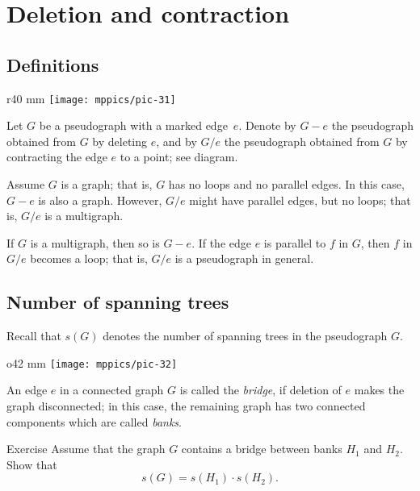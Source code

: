 \chapter{Deletion and contraction}
\label{Deletion and contraction}

\section{Definitions}


\begin{wrapfigure}{r}{40 mm}
\vskip-12mm
\centering
\texttt{[image: mppics/pic-31]}
\vskip-0mm
\end{wrapfigure}

Let $G$ be a pseudograph with a marked edge~$e$.
Denote by $G- e$ the pseudograph obtained from $G$ by deleting $e$,
and by $G/e$ the pseudograph obtained from $G$ by contracting the edge $e$ to a point; see diagram.

Assume $G$ is a graph; that is, $G$ has no loops and no parallel edges.
In this case, $G- e$ is also a graph.
However, $G/e$ might have parallel edges, but no loops; that is, $G/e$ is a multigraph.

If $G$ is a multigraph, then so is $G- e$.
If the edge $e$ is parallel to $f$ in $G$, then $f$ in $G/e$ becomes a loop; that is, $G/e$ is a pseudograph in general.


\section{Number of spanning trees}

Recall that $s(G)$ denotes the number of spanning trees in the pseudograph $G$.

{
\begin{wrapfigure}{o}{42 mm}
\vskip-4mm
\centering
\texttt{[image: mppics/pic-32]}
\vskip-0mm
\end{wrapfigure}

An edge $e$ in a connected graph $G$ is called the \emph{bridge}, if deletion of $e$ makes the graph disconnected;
in this case, the remaining graph has two connected components which are called \emph{banks}.


\begin{thm}{Exercise}\label{ex:bridge}
Assume that the graph $G$ contains a bridge between banks $H_1$ and $H_2$.
Show that
\[s(G)=s(H_1)\cdot s(H_2).\]
\end{thm}

}


